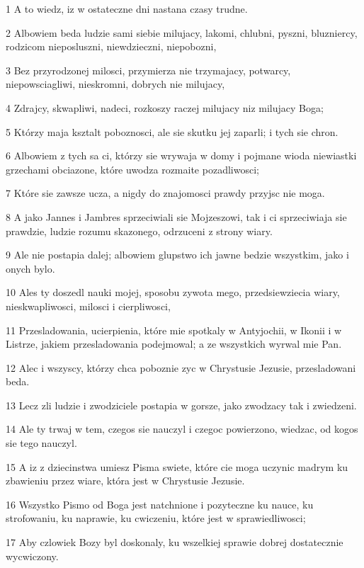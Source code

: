 \par 1 A to wiedz, iz w ostateczne dni nastana czasy trudne.
\par 2 Albowiem beda ludzie sami siebie milujacy, lakomi, chlubni, pyszni, bluzniercy, rodzicom nieposluszni, niewdzieczni, niepobozni,
\par 3 Bez przyrodzonej milosci, przymierza nie trzymajacy, potwarcy, niepowsciagliwi, nieskromni, dobrych nie milujacy,
\par 4 Zdrajcy, skwapliwi, nadeci, rozkoszy raczej milujacy niz milujacy Boga;
\par 5 Którzy maja ksztalt poboznosci, ale sie skutku jej zaparli; i tych sie chron.
\par 6 Albowiem z tych sa ci, którzy sie wrywaja w domy i pojmane wioda niewiastki grzechami obciazone, które uwodza rozmaite pozadliwosci;
\par 7 Które sie zawsze ucza, a nigdy do znajomosci prawdy przyjsc nie moga.
\par 8 A jako Jannes i Jambres sprzeciwiali sie Mojzeszowi, tak i ci sprzeciwiaja sie prawdzie, ludzie rozumu skazonego, odrzuceni z strony wiary.
\par 9 Ale nie postapia dalej; albowiem glupstwo ich jawne bedzie wszystkim, jako i onych bylo.
\par 10 Ales ty doszedl nauki mojej, sposobu zywota mego, przedsiewziecia wiary, nieskwapliwosci, milosci i cierpliwosci,
\par 11 Przesladowania, ucierpienia, które mie spotkaly w Antyjochii, w Ikonii i w Listrze, jakiem przesladowania podejmowal; a ze wszystkich wyrwal mie Pan.
\par 12 Alec i wszyscy, którzy chca poboznie zyc w Chrystusie Jezusie, przesladowani beda.
\par 13 Lecz zli ludzie i zwodziciele postapia w gorsze, jako zwodzacy tak i zwiedzeni.
\par 14 Ale ty trwaj w tem, czegos sie nauczyl i czegoc powierzono, wiedzac, od kogos sie tego nauczyl.
\par 15 A iz z dziecinstwa umiesz Pisma swiete, które cie moga uczynic madrym ku zbawieniu przez wiare, która jest w Chrystusie Jezusie.
\par 16 Wszystko Pismo od Boga jest natchnione i pozyteczne ku nauce, ku strofowaniu, ku naprawie, ku cwiczeniu, które jest w sprawiedliwosci;
\par 17 Aby czlowiek Bozy byl doskonaly, ku wszelkiej sprawie dobrej dostatecznie wycwiczony.

